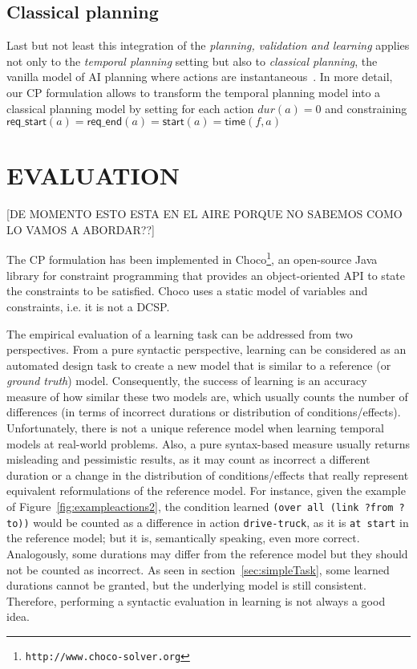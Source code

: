 \documentclass{ecai}
\newcommand{\start}{\mathsf{start}}%
\newcommand{\tim}{\mathsf{time}}   %
\newcommand{\reqs}{\mathsf{req\_{start}}} %
\newcommand{\reqe}{\mathsf{req\_{end}}}   %
\begin{document}
\subsection{Classical planning}
Last but not least this integration of the {\em planning, validation and learning} applies not only to the {\em temporal planning} setting but also to {\em classical planning}, the vanilla model of AI planning where actions are instantaneous~\cite{geffner2013concise}. In more detail, our CP formulation allows to transform the temporal planning model into a classical planning model by setting for each action $dur(a)=0$ and constraining $\reqs(a)=\reqe(a)=\start(a)=\tim(f,a)$






  
\section{EVALUATION}
\label{sec:evaluation}

[DE MOMENTO ESTO ESTA EN EL AIRE PORQUE NO SABEMOS COMO LO VAMOS A ABORDAR??]

The CP formulation has been implemented in \textsf{Choco}\footnote{\texttt{http://www.choco-solver.org}}, an open-source Java library for constraint programming that provides an object-oriented API to state the constraints to be satisfied. \textsf{Choco} uses a static model of variables and constraints, i.e. it is not a DCSP.

The empirical evaluation of a learning task can be addressed from two perspectives. From a pure syntactic perspective, learning can be considered as an automated design task to create a new model that is similar to a reference (or {\em ground truth}) model. Consequently, the success of learning is an accuracy measure of how similar these two models are, which usually counts the number of differences (in terms of incorrect durations or distribution of conditions/effects). Unfortunately, there is not a unique reference model when learning temporal models at real-world problems. Also, a pure syntax-based measure usually returns misleading and pessimistic results, as it may count as incorrect a different duration or a change in the distribution of conditions/effects that really represent equivalent reformulations of the reference model. For instance, given the example of Figure~\ref{fig:exampleactions2}, the condition learned \texttt{(over all (link ?from ?to))} would be counted as a difference in action \texttt{drive-truck}, as it is \texttt{at start} in the reference model; but it is, semantically speaking, even more correct. Analogously, some durations may differ from the reference model but they should not be counted as incorrect. As seen in section~\ref{sec:simpleTask}, some learned durations cannot be granted, but the underlying model is still consistent. Therefore, performing a syntactic evaluation in learning is not always a good idea.
\end{document}
